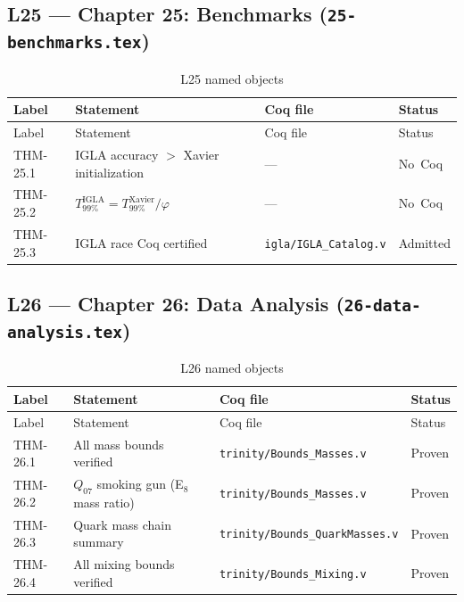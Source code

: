 \subsection{L25 — Chapter 25: Benchmarks
  (\texttt{25-benchmarks.tex})}
\label{sec:A-L25}

\begin{longtable}{lp{6cm}ll}
\toprule
Label & Statement & Coq file & Status \\
\midrule
\endfirsthead
\toprule
Label & Statement & Coq file & Status \\
\midrule
\endhead
\bottomrule
\endfoot
\bottomrule
\caption{L25 named objects}
\endlastfoot
THM-25.1 & IGLA accuracy $>$ Xavier initialization & --- & No~Coq \\
THM-25.2 &
  $T_{99\%}^{\text{IGLA}} = T_{99\%}^{\text{Xavier}}/\varphi$ &
  --- & No~Coq \\
THM-25.3 & IGLA race Coq certified &
  \texttt{igla/IGLA\_Catalog.v} & Admitted \\
\end{longtable}

\subsection{L26 — Chapter 26: Data Analysis
  (\texttt{26-data-analysis.tex})}
\label{sec:A-L26}

\begin{longtable}{lp{6cm}ll}
\toprule
Label & Statement & Coq file & Status \\
\midrule
\endfirsthead
\toprule
Label & Statement & Coq file & Status \\
\midrule
\endhead
\bottomrule
\endfoot
\bottomrule
\caption{L26 named objects}
\endlastfoot
THM-26.1 & All mass bounds verified &
  \texttt{trinity/Bounds\_Masses.v} & Proven \\
THM-26.2 & $Q_{07}$ smoking gun (E$_8$ mass ratio) &
  \texttt{trinity/Bounds\_Masses.v} & Proven \\
THM-26.3 & Quark mass chain summary &
  \texttt{trinity/Bounds\_QuarkMasses.v} & Proven \\
THM-26.4 & All mixing bounds verified &
  \texttt{trinity/Bounds\_Mixing.v} & Proven \\
\end{longtable}


